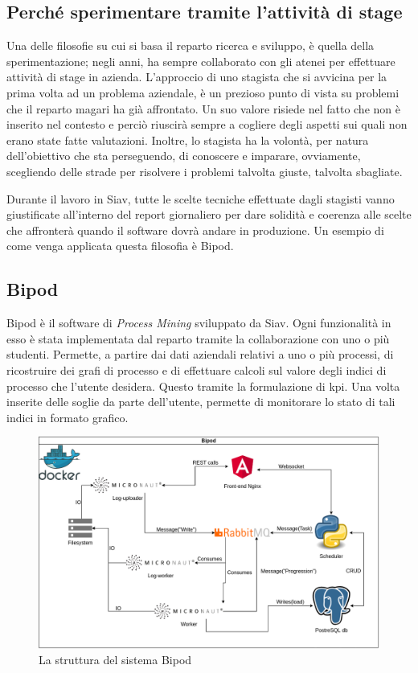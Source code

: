 \subsection{Perché sperimentare tramite l'attività di stage}
\label{ssec:sperimentareStage}
Una delle filosofie su cui si basa il reparto ricerca e sviluppo, è quella della sperimentazione; negli anni, ha sempre collaborato con gli atenei per effettuare attività di stage in azienda. L'approccio di uno stagista che si avvicina per la prima volta ad un problema aziendale, è un prezioso punto di vista su problemi che il reparto magari ha già affrontato. Un suo valore risiede nel fatto che non è inserito nel contesto e perciò riuscirà sempre a cogliere degli aspetti sui quali non erano state fatte valutazioni. Inoltre, lo stagista ha la volontà, per natura dell'obiettivo che sta perseguendo, di conoscere e imparare, ovviamente, scegliendo delle strade per risolvere i problemi talvolta giuste, talvolta sbagliate.

Durante il lavoro in Siav, tutte le scelte tecniche effettuate dagli stagisti vanno giustificate all'interno del report giornaliero per dare solidità e coerenza alle scelte che affronterà quando il software dovrà andare in produzione. Un esempio di come venga applicata questa filosofia è Bipod.
\subsection{Bipod}
Bipod è il software di \textit{Process Mining} sviluppato da Siav. Ogni funzionalità in esso è stata implementata dal reparto tramite la collaborazione con uno o più studenti. Permette, a partire dai dati aziendali relativi a uno o più processi, di ricostruire dei grafi di processo e di effettuare calcoli sul valore degli indici di processo che l'utente desidera. Questo tramite la formulazione di \acrshort{kpi}\glsfirstoccur. Una volta inserite delle soglie da parte dell'utente, permette di monitorare lo stato di tali indici in formato grafico.
\begin{figure}[H]
    \centering
    \includegraphics[width=\columnwidth]{immagini/Bipod docker scheme.png}
    \caption{La struttura del sistema Bipod}
    \label{fig:bipodMessages}
\end{figure}

